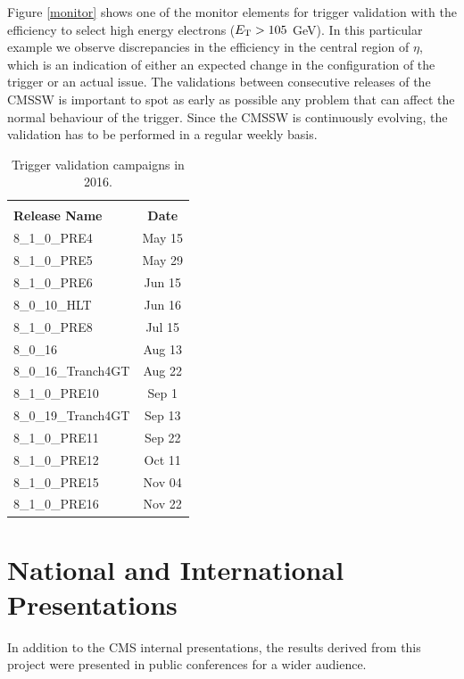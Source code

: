 Figure \ref{monitor} shows one of the monitor elements for trigger validation with the efficiency to select high energy electrons ($E_{\rm T}> 105$ GeV). In this particular example we observe discrepancies in the efficiency in the central region of $\eta$, which is an indication of either an expected change in the configuration of the trigger or an actual issue. The validations between consecutive releases of the CMSSW is important to spot as early as possible any problem that can affect the normal behaviour of the trigger. Since the CMSSW is continuously evolving, the validation has to be performed in a regular weekly basis. 


\begin{table}[htb]
\centering
\caption[Trigger validation campaigns in 2016]{Trigger validation campaigns in 2016.}
\label{validations}
\begin{tabular}{lc} \hline
&\\[-0.2cm]
{\bf Release Name} & {\bf Date}  \\[0.2cm]
\hline\hline
{ 8\_1\_0\_PRE4}           & { May 15} \\
{ 8\_1\_0\_PRE5}           & { May 29} \\
{ 8\_1\_0\_PRE6}           & { Jun 15} \\
{ 8\_0\_10\_HLT}           & { Jun 16} \\
{ 8\_1\_0\_PRE8}           & { Jul 15} \\
{ 8\_0\_16}                & { Aug 13} \\
{ 8\_0\_16\_Tranch4GT}     & { Aug 22} \\
{ 8\_1\_0\_PRE10}          & { Sep 1 } \\
{ 8\_0\_19\_Tranch4GT}     & { Sep 13} \\
{ 8\_1\_0\_PRE11}          & { Sep 22} \\
{ 8\_1\_0\_PRE12}          & { Oct 11} \\
{ 8\_1\_0\_PRE15}          & { Nov 04} \\
{ 8\_1\_0\_PRE16}          & { Nov 22} \\
\hline
\end{tabular}
\end{table}

\section{National and International Presentations}

In addition to the CMS internal presentations, the results derived from this project were presented in public conferences for a wider audience. 

